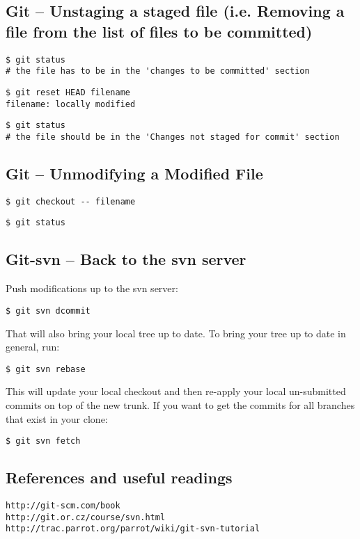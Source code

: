 \documentclass[11pt,twoside]{article}
\begin{document}
\subsection*{Git -- Unstaging a staged file (i.e. Removing a file from the list of files to be 
committed)}

\begin{verbatim}
$ git status 
# the file has to be in the 'changes to be committed' section
\end{verbatim}

\begin{verbatim}
$ git reset HEAD filename
filename: locally modified
\end{verbatim}
\begin{verbatim}
$ git status  
# the file should be in the 'Changes not staged for commit' section
\end{verbatim}

\subsection*{Git -- Unmodifying a Modified File}

\begin{verbatim}
$ git checkout -- filename
\end{verbatim}
\begin{verbatim}
$ git status
\end{verbatim}

\subsection*{Git-svn -- Back to the svn server}

Push modifications up to the svn server:
\begin{verbatim}
$ git svn dcommit
\end{verbatim}
That will also bring your local tree up to date. To bring your tree up to date in general, run: 
\begin{verbatim}
$ git svn rebase
\end{verbatim}
This will update your local checkout and then re-apply your local un-submitted commits on top of the new trunk. 
If you want to get the commits for all branches that exist in your clone: 
\begin{verbatim}
$ git svn fetch
\end{verbatim}

\subsection*{References and useful readings}

\verb|http://git-scm.com/book|
\\
\verb|http://git.or.cz/course/svn.html|
\\
\verb|http://trac.parrot.org/parrot/wiki/git-svn-tutorial|
\end{document}
